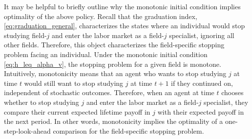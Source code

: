 \documentclass[11 pt]{article}
\newcommand{\toedit}[1]{{\color{gray}#1}}
\newcommand{\toedit}[1]{#1}
\begin{document}
\toedit{It may be helpful to briefly outline why the monotonic initial condition implies optimality of the above policy.}
Recall that the graduation index, \eqref{eq:graduation_general}, characterizes the states where an individual would stop studying field-$j$ and enter the labor market as a field-$j$ specialist, ignoring all other fields.
Therefore, this object characterizes the field-specific stopping problem facing an individual.
Under the monotonic initial condition \eqref{eq:h_leq_alpha_v}, the stopping problem for a given field is monotone.
Intuitively, monotonicity means that an agent who wants to stop studying $j$ at time $t$ would still want to stop studying $j$ at time $t+1$ if they continued on, independent of stochastic outcomes.
Therefore, when an agent at time $t$ chooses whether to stop studying $j$ and enter the labor market as a field-$j$ specialist, they compare their current expected lifetime payoff in $j$ with their expected payoff in the next period.
In other words, monotonicity implies the optimality of a one-step-look-ahead comparison for the field-specific stopping problem.
\end{document}
